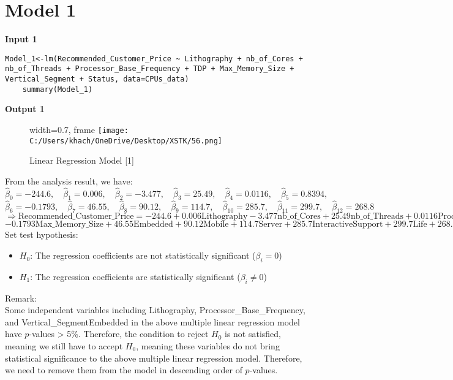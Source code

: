 \documentclass[a4paper]{article}
\begin{document}
	\section*{Model 1}
	\textbf{Input 1}
	\begin{lstlisting}[frame=single, backgroundcolor=\color{gray!10}, breaklines=true, columns=fullflexible]
	Model_1<-lm(Recommended_Customer_Price ~ Lithography + nb_of_Cores + nb_of_Threads + Processor_Base_Frequency + TDP + Max_Memory_Size + Vertical_Segment + Status, data=CPUs_data)
	summary(Model_1)
	\end{lstlisting}
	\textbf{Output 1}
	\begin{figure}[htbp]
		\centering
		\begin{adjustbox}{width=0.7\textwidth, frame}
			\texttt{[image: C:/Users/khach/OneDrive/Desktop/XSTK/56.png]}
		\end{adjustbox}
		\captionsetup{justification=centering}
		\vspace{0.5cm}
		\caption{Linear Regression Model [1]}
	\end{figure}
	From the analysis result, we have:
	\[
	\hat{\beta}_0 = -244.6, \quad \hat{\beta}_1 = 0.006, \quad \hat{\beta}_2 = -3.477, \quad \hat{\beta}_3 = 25.49, \quad \hat{\beta}_4 = 0.0116, \quad \hat{\beta}_5 = 0.8394,
	\]
	\[
	\hat{\beta}_6 = -0.1793, \quad \hat{\beta}_7 = 46.55, \quad \hat{\beta}_8 = 90.12, \quad \hat{\beta}_9 = 114.7, \quad \hat{\beta}_{10} = 285.7, \quad \hat{\beta}_{11} = 299.7, \quad \hat{\beta}_{12} = 268.8
	\]
	\[
	\Rightarrow \text{Recommended\_Customer\_Price} = -244.6 + 0.006 \text{Lithography} - 3.477 \text{nb\_of\_Cores} + 25.49 \text{nb\_of\_Threads} + 0.0116 \text{Processor\_Base\_Frequency} + 0.8394 \text{TDP}
	\]
	\[
	- 0.1793 \text{Max\_Memory\_Size} + 46.55 \text{Embedded} + 90.12 \text{Mobile} + 114.7 \text{Server} + 285.7 \text{InteractiveSupport} + 299.7 \text{Life} + 268.8 \text{Launched}
	\]
	Set test hypothesis:
	\begin{itemize}
		\item $H_0$: The regression coefficients are not statistically significant ($\beta_i = 0$)
		\item $H_1$: The regression coefficients are statistically significant ($\beta_i \neq 0$)
	\end{itemize}
	Remark:\\
	Some independent variables including Lithography, Processor\_Base\_Frequency, and Vertical\_SegmentEmbedded in the above multiple linear regression model have $p$-values > 5\%. Therefore, the condition to reject $H_0$ is not satisfied, meaning we still have to accept $H_0$, meaning these variables do not bring statistical significance to the above multiple linear regression model. Therefore, we need to remove them from the model in descending order of $p$-values.
\end{document}
